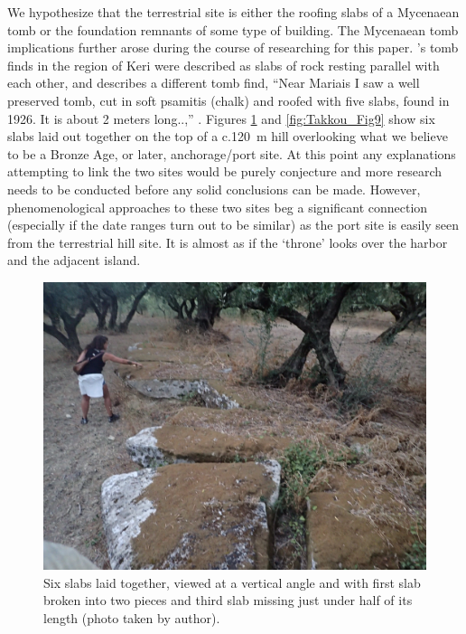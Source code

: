 We hypothesize that the terrestrial site is either the roofing slabs of a Mycenaean tomb or the foundation remnants of some type of building. The Mycenaean tomb implications further arose during the course of researching for this paper. \textcite{Agallopoulou_1973}'s tomb finds in the region of Keri were described as slabs of rock resting parallel with each other, and \textcite{Benton_1933} describes a different tomb find, “Near Mariais I saw a well preserved tomb, cut in soft psamitis (chalk) and roofed with five slabs, found in 1926. It is about 2 meters long..,” \parencite[21]{Benton_1933}. Figures \ref{fig:Takkou_Fig7} and \ref{fig:Takkou_Fig9} show six slabs laid out together on the top of a c.\SI{120}{\metre} hill overlooking what we believe to be a Bronze Age, or later, anchorage/port site. At this point any explanations attempting to link the two sites would be purely conjecture and more research needs to be conducted before any solid conclusions can be made. However, phenomenological approaches to these two sites beg a significant connection (especially if the date ranges turn out to be similar) as the port site is easily seen from the terrestrial hill site. It is almost as if the ‘throne’ looks over the harbor and the adjacent island.

\begin{figure}[!p]
	\includegraphics[width=.9\linewidth]{figures/takkou_dobroski_Fig7.jpg}
	\centering
	\caption{Six slabs laid together, viewed at a vertical angle and with first slab broken into two pieces and third slab missing just under half of its length (photo taken by author).}
	\label{fig:Takkou_Fig7}
\end{figure}

